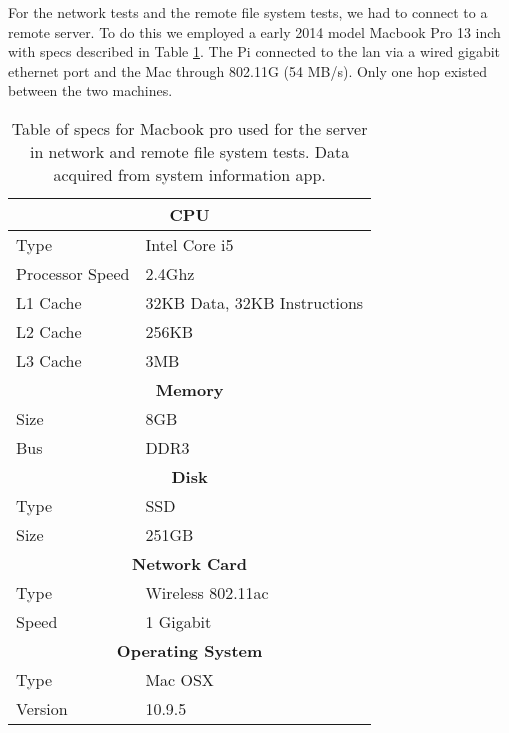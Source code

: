 For the network tests and the remote file system tests, we had to connect to a remote server.
To do this we employed a early 2014 model Macbook Pro 13 inch with specs described in Table \ref{tbl:macbookspecs}.
The Pi connected to the lan via a wired gigabit ethernet port and the Mac through 802.11G (54 MB/s).
Only one hop existed between the two machines.

\begin{table}[h]
\centering
\begin{tabular}{|l|l|}
\hline
\multicolumn{2}{|c|}{\textbf{CPU}}              \\ \hline
Type                 & Intel Core i5         \\ \hline
Processor Speed & 2.4Ghz                    \\ \hline
L1 Cache             & 32KB Data, 32KB Instructions          \\ \hline
L2 Cache             & 256KB           \\ \hline
L3 Cache             & 3MB           \\ \hline
\multicolumn{2}{|c|}{\textbf{Memory}}           \\ \hline
Size                 &  8GB          \\ \hline
Bus                  & DDR3                     \\ \hline
\multicolumn{2}{|c|}{\textbf{Disk}}             \\ \hline
Type                 & SSD           \\ \hline
Size                 & 251GB                     \\ \hline
\multicolumn{2}{|c|}{\textbf{Network Card}}     \\ \hline
Type                 & Wireless 802.11ac \\ \hline
Speed                &1 Gigabit                  \\ \hline
\multicolumn{2}{|c|}{\textbf{Operating System}} \\ \hline
Type                 & Mac OSX                      \\ \hline
Version             & 10.9.5 \hline
\end{tabular}
\caption{Table of specs for Macbook pro used for the server in network and remote file system tests.  Data acquired from system information app.}
\label{tbl:macbookspecs}
\end{table}
